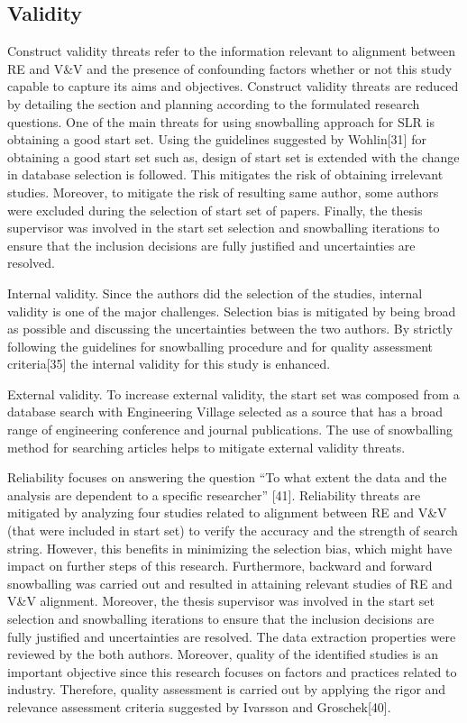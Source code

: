 \documentclass{article}
\begin{document}
\subsection{Validity}


Construct validity threats refer to the information relevant to alignment between RE and V&V and the presence of confounding factors whether or not this study capable to capture its aims and objectives. Construct validity threats are reduced by detailing the section and planning according to the formulated research questions. One of the main threats for using snowballing approach for SLR is obtaining a good start set. Using the guidelines suggested by Wohlin[31] for obtaining a good start set such as, design of start set is extended with the change in database selection is followed. This mitigates the risk of obtaining irrelevant studies. Moreover, to mitigate the risk of resulting same author, some authors were excluded during the selection of start set of papers. Finally, the thesis supervisor was involved in the start set selection and snowballing iterations to ensure that the inclusion decisions are fully justified and uncertainties are resolved.

Internal validity. Since the authors did the selection of the studies, internal validity is one of the major challenges. Selection bias is mitigated by being broad as possible and discussing the uncertainties between the two authors. By strictly following the guidelines for snowballing procedure and for quality assessment criteria[35] the internal validity for this study is enhanced. 

External validity. To increase external validity, the start set was composed from a database search with Engineering Village selected as a source that has a broad range of engineering conference and journal publications. The use of snowballing method for searching articles helps to mitigate external validity threats. 

Reliability focuses on answering the question “To what extent the data and the analysis are dependent to a specific researcher” [41]. Reliability threats are mitigated by analyzing four studies related to alignment between RE and V&V (that were included in start set) to verify the accuracy and the strength of search string. However, this benefits in minimizing the selection bias, which might have impact on further steps of this research.  Furthermore, backward and forward snowballing was carried out and resulted in attaining relevant studies of RE and V&V alignment. Moreover, the thesis supervisor was involved in the start set selection and snowballing iterations to ensure that the inclusion decisions are fully justified and uncertainties are resolved.
The data extraction properties were reviewed by the both authors. Moreover, quality of the identified studies is an important objective since this research focuses on factors and practices related to industry. Therefore, quality assessment is carried out by applying the rigor and relevance assessment criteria suggested by Ivarsson and Groschek[40]. 
\end{document}
